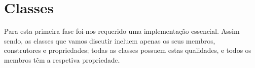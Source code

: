 \chapter{Classes}
Para esta primeira fase foi-nos requerido uma implementação essencial. Assim sendo, as classes que vamos discutir incluem apenas os seus membros, construtores e propriedades; todas as classes possuem estas qualidades, e todos os membros têm a respetiva propriedade.
